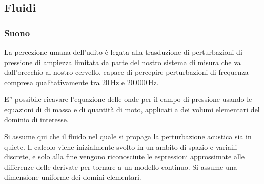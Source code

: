 \documentclass[letterpaper,10pt,italian]{jupyterBook}
\begin{document}
\subsection{Fluidi}
\label{\detokenize{ch/waves/waves-in-physics:fluidi}}\label{\detokenize{ch/waves/waves-in-physics:physics-hs-waves-equation-examples-fluids}}

\subsubsection{Suono}
\label{\detokenize{ch/waves/waves-in-physics:suono}}\label{\detokenize{ch/waves/waves-in-physics:physics-hs-waves-equation-examples-fluids-sound}}
\sphinxAtStartPar
La percezione umana dell’udito è legata alla trasduzione di perturbazioni di pressione di ampiezza limitata da parte del nostro sistema di misura che va dall’orecchio al nostro cervello, capace di percepire perturbazioni di frequenza compresa qualitativamente tra \(20 \, \text{Hz}\) e \(20.000 \, \text{Hz}\).

\sphinxAtStartPar
E” possibile ricavare l’equazione delle onde per il campo di pressione usando le equazioni di {\hyperref[\detokenize{ch/mechanics/dynamics-eom-open:physics-hs-mechanics-dynamics-eom-open}]{}} di massa e di quantità di moto, applicati a dei volumi elementari del dominio di interesse.

\sphinxAtStartPar
Si assume qui che il fluido nel quale si propaga la perturbazione acustica sia in quiete. Il calcolo viene inizialmente svolto in un ambito di spazio e variaili discrete, e solo alla fine vengono riconosciute le espressioni approssimate alle differenze delle derivate per tornare a un modello continuo. Si assume una dimensione uniforme dei domini elementari.
\end{document}
